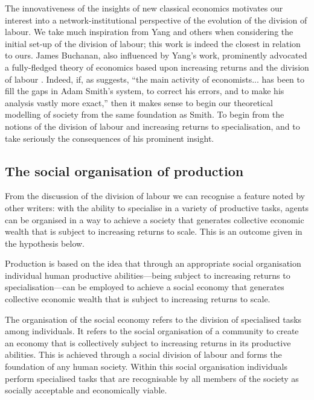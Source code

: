 \medskip \noindent The innovativeness of the insights of new classical economics motivates our interest into a network-institutional perspective of the evolution of the division of labour. We take much inspiration from Yang and others when considering the initial set-up of the division of labour; this work is indeed the closest in relation to ours. James Buchanan, also influenced by Yang's work, prominently advocated a fully-fledged theory of economics based upon increasing returns and the division of labour \citep{BuchananYoon1994}. Indeed, if, as \citet[p.~713]{Coase1992} suggests, ``the main activity of economists... has been to fill the gaps in Adam Smith's system, to correct his errors, and to make his analysis vastly more exact,'' then it makes sense to begin our theoretical modelling of society from the same foundation as Smith. To begin from the notions of the division of labour and increasing returns to specialisation, and to take seriously the consequences of his prominent insight.

\subsection{The social organisation of production}

From the discussion of the division of labour we can recognise a feature noted by other writers: with the ability to specialise in a variety of productive tasks, agents can be organised in a way to achieve a society that generates collective economic wealth that is subject to increasing returns to scale. This is an outcome given in the hypothesis below.

\begin{hypothesis} \label{hyp:socialorganisationproduction}
Production is based on the idea that through an appropriate social organisation individual human productive abilities---being subject to increasing returns to specialisation---can be employed to achieve a social economy that generates collective economic wealth that is subject to increasing returns to scale.
\end{hypothesis}

The organisation of the social economy refers to the division of specialised tasks among individuals. It refers to the social organisation of a community to create an economy that is collectively subject to increasing returns in its productive abilities. This is achieved through a social division of labour and forms the foundation of any human society. Within this social organisation individuals perform specialised tasks that are recognisable by all members of the society as socially acceptable and economically viable.

